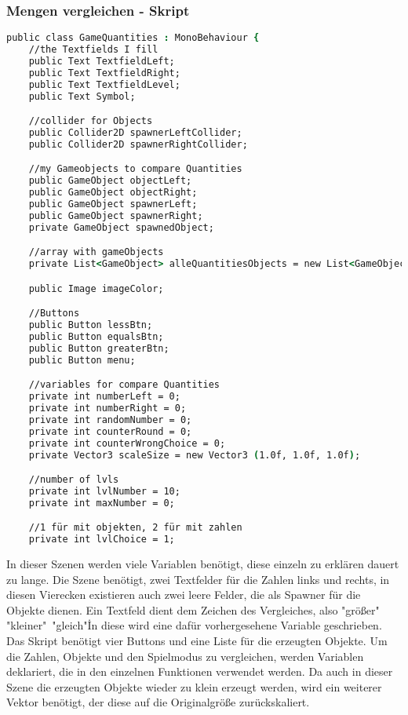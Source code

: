 \subsubsection{Mengen vergleichen - Skript}
\begin{lstlisting}[language=csh, caption={GameQuantities.cs Variablen-Deklaration}]
public class GameQuantities : MonoBehaviour {
	//the Textfields I fill
	public Text TextfieldLeft;
	public Text TextfieldRight;
	public Text TextfieldLevel;
	public Text Symbol;

	//collider for Objects
	public Collider2D spawnerLeftCollider;
	public Collider2D spawnerRightCollider;

	//my Gameobjects to compare Quantities
	public GameObject objectLeft;
	public GameObject objectRight;
	public GameObject spawnerLeft;
	public GameObject spawnerRight;
	private GameObject spawnedObject;

	//array with gameObjects
	private List<GameObject> alleQuantitiesObjects = new List<GameObject>(40);

	public Image imageColor;

	//Buttons
	public Button lessBtn;
	public Button equalsBtn;
	public Button greaterBtn;
	public Button menu;

	//variables for compare Quantities
	private int numberLeft = 0;
	private int numberRight = 0;
	private int randomNumber = 0;
	private int counterRound = 0;
	private int counterWrongChoice = 0;
	private Vector3 scaleSize = new Vector3 (1.0f, 1.0f, 1.0f);

	//number of lvls
	private int lvlNumber = 10;
	private int maxNumber = 0;

	//1 für mit objekten, 2 für mit zahlen
	private int lvlChoice = 1;
\end{lstlisting}
In dieser Szenen werden viele Variablen benötigt, diese einzeln zu erklären dauert zu lange. Die Szene benötigt, zwei Textfelder für die Zahlen links und rechts, in diesen Vierecken existieren auch zwei leere Felder, die als Spawner für die Objekte dienen. Ein Textfeld dient dem Zeichen des Vergleiches, also "größer"\, "kleiner"\, "gleich"\. In diese wird eine dafür vorhergesehene Variable geschrieben. Das Skript benötigt vier Buttons und eine Liste für die erzeugten Objekte. Um die Zahlen, Objekte und den Spielmodus zu vergleichen, werden Variablen deklariert, die in den einzelnen Funktionen verwendet werden. Da auch in dieser Szene die erzeugten Objekte wieder zu klein erzeugt werden, wird ein weiterer Vektor benötigt, der diese auf die Originalgröße zurückskaliert.\\
